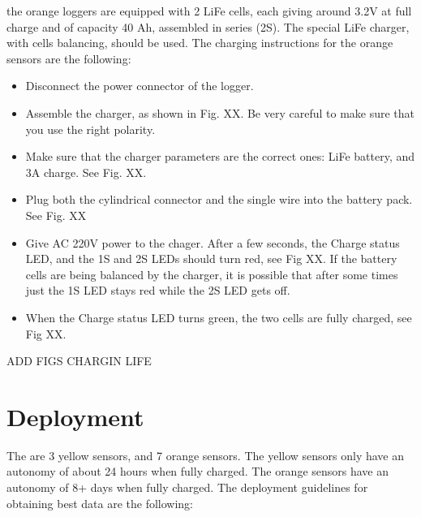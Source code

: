 \documentclass[pdftex,a4paper,12pt,twocolumn,fleqn,captions=tableheading]{scrartcl}
\begin{document}
the orange loggers are equipped with 2 LiFe cells, each giving around 3.2V at full charge and of capacity 40 Ah, assembled in series (2S). The special LiFe charger, with cells balancing, should be used. The charging instructions for the orange sensors are the following:

\begin{itemize}
  \item Disconnect the power connector of the logger.

  \item Assemble the charger, as shown in Fig. XX. Be very careful to make sure that you use the right polarity.

  \item Make sure that the charger parameters are the correct ones: LiFe battery, and 3A charge. See Fig. XX.

  \item Plug both the cylindrical connector and the single wire into the battery pack. See Fig. XX

  \item Give AC 220V power to the chager. After a few seconds, the Charge status LED, and the 1S and 2S LEDs should turn red, see Fig XX. If the battery cells are being balanced by the charger, it is possible that after some times just the 1S LED stays red while the 2S LED gets off.

  \item When the Charge status LED turns green, the two cells are fully charged, see Fig XX.
\end{itemize}

ADD FIGS CHARGIN LIFE

\section{Deployment}

The are 3 yellow sensors, and 7 orange sensors. The yellow sensors only have an autonomy of about 24 hours when fully charged. The orange sensors have an autonomy of 8+ days when fully charged. The deployment guidelines for obtaining best data are the following:
\end{document}
